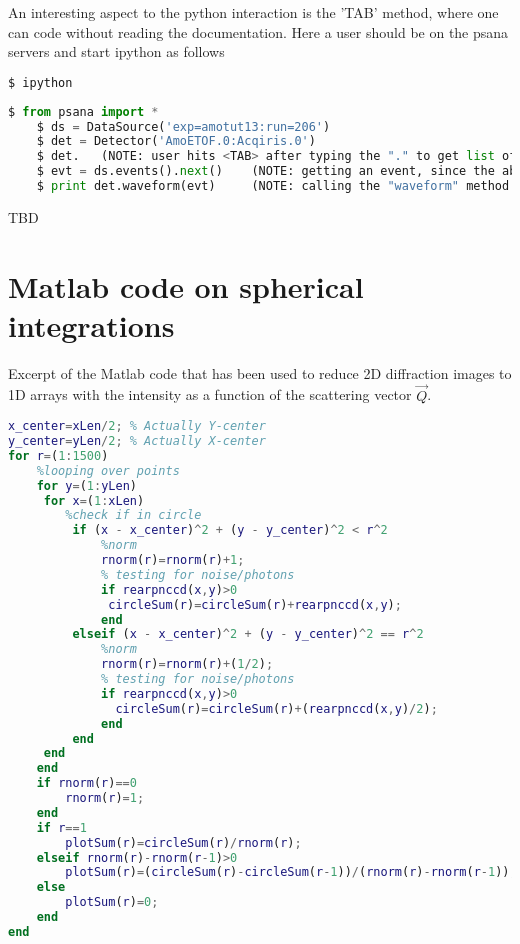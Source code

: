 An interesting aspect to the python interaction is the 'TAB' method, where one can code without reading the documentation. Here a user should be on the psana servers and start ipython as follows
\begin{lstlisting}[language=csh,basicstyle=\footnotesize]
	$ ipython
\end{lstlisting}
\begin{lstlisting}[language=Python,basicstyle=\footnotesize]
	$ from psana import *
	$ ds = DataSource('exp=amotut13:run=206')
	$ det = Detector('AmoETOF.0:Acqiris.0')
	$ det.   (NOTE: user hits <TAB> after typing the "." to get list of available methods)
	$ evt = ds.events().next()    (NOTE: getting an event, since the above "Definition" line requires it)
	$ print det.waveform(evt)     (NOTE: calling the "waveform" method as required by the above "Definition" line)
\end{lstlisting}
TBD
%
%
%
\section{Matlab code on spherical integrations}\label{sec:spherical-integration}
Excerpt of the Matlab code that has been used to reduce 2D diffraction images to 1D arrays with the intensity as a function of the scattering vector $\vec{Q}$.
\begin{lstlisting}[language=matlab,frame=single,basicstyle=\footnotesize]
%%% CENTER OF HIT
x_center=xLen/2; % Actually Y-center
y_center=yLen/2; % Actually X-center
for r=(1:1500)
    %looping over points
    for y=(1:yLen)
     for x=(1:xLen)
        %check if in circle
         if (x - x_center)^2 + (y - y_center)^2 < r^2
             %norm
             rnorm(r)=rnorm(r)+1;
             % testing for noise/photons
             if rearpnccd(x,y)>0
              circleSum(r)=circleSum(r)+rearpnccd(x,y);
             end
         elseif (x - x_center)^2 + (y - y_center)^2 == r^2
             %norm
             rnorm(r)=rnorm(r)+(1/2);
             % testing for noise/photons
             if rearpnccd(x,y)>0
               circleSum(r)=circleSum(r)+(rearpnccd(x,y)/2);
             end
         end
     end
    end
    if rnorm(r)==0
        rnorm(r)=1;
    end
    if r==1
        plotSum(r)=circleSum(r)/rnorm(r);
    elseif rnorm(r)-rnorm(r-1)>0
        plotSum(r)=(circleSum(r)-circleSum(r-1))/(rnorm(r)-rnorm(r-1));
    else
        plotSum(r)=0;
    end
end
\end{lstlisting}
%
%
%
\iffalse
